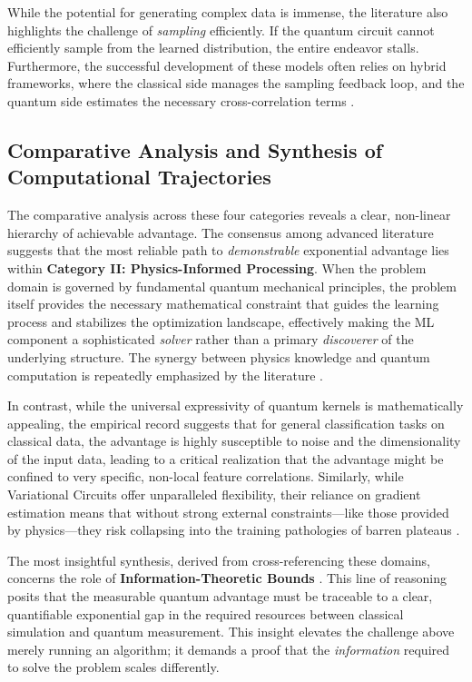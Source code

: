 \documentclass{article}
\begin{document}
While the potential for generating complex data is immense, the literature also highlights the challenge of \textit{sampling} efficiently. If the quantum circuit cannot efficiently sample from the learned distribution, the entire endeavor stalls. Furthermore, the successful development of these models often relies on hybrid frameworks, where the classical side manages the sampling feedback loop, and the quantum side estimates the necessary cross-correlation terms \cite{zhou2022hybrid}.

\subsection{Comparative Analysis and Synthesis of Computational Trajectories}

\label{sec:comparative\_analysis\_and\_synthesis\_of\_co}

The comparative analysis across these four categories reveals a clear, non-linear hierarchy of achievable advantage. The consensus among advanced literature suggests that the most reliable path to \textit{demonstrable} exponential advantage lies within \textbf{Category II: Physics-Informed Processing}. When the problem domain is governed by fundamental quantum mechanical principles, the problem itself provides the necessary mathematical constraint that guides the learning process and stabilizes the optimization landscape, effectively making the ML component a sophisticated \textit{solver} rather than a primary \textit{discoverer} of the underlying structure. The synergy between physics knowledge and quantum computation is repeatedly emphasized by the literature \cite{cuomo2022scientific}.

In contrast, while the universal expressivity of quantum kernels \cite{jager2023universal} is mathematically appealing, the empirical record suggests that for general classification tasks on classical data, the advantage is highly susceptible to noise and the dimensionality of the input data, leading to a critical realization that the advantage might be confined to very specific, non-local feature correlations. Similarly, while Variational Circuits offer unparalleled flexibility, their reliance on gradient estimation means that without strong external constraints---like those provided by physics---they risk collapsing into the training pathologies of barren plateaus \cite{cerezo2021cost}.

The most insightful synthesis, derived from cross-referencing these domains, concerns the role of \textbf{Information-Theoretic Bounds} \cite{huang2021informationtheoretic}. This line of reasoning posits that the measurable quantum advantage must be traceable to a clear, quantifiable exponential gap in the required resources between classical simulation and quantum measurement. This insight elevates the challenge above merely running an algorithm; it demands a proof that the \textit{information} required to solve the problem scales differently.
\end{document}
